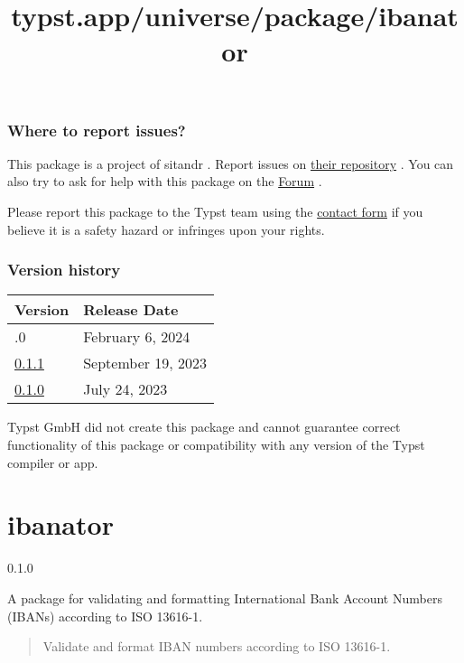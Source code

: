 \subsubsection{Where to report issues?}\label{where-to-report-issues}

This package is a project of sitandr . Report issues on
\href{https://github.com/sitandr/conchord}{their repository} . You can
also try to ask for help with this package on the
\href{https://forum.typst.app}{Forum} .

Please report this package to the Typst team using the
\href{https://typst.app/contact}{contact form} if you believe it is a
safety hazard or infringes upon your rights.

\label{versions}
\subsubsection{Version history}\label{version-history}

\begin{longtable}[]{@{}ll@{}}
\toprule\noalign{}
Version & Release Date \\
\midrule\noalign{}
\endhead
\bottomrule\noalign{}
\endlastfoot
0.2.0 & February 6, 2024 \\
\href{https://typst.app/universe/package/conchord/0.1.1/}{0.1.1} &
September 19, 2023 \\
\href{https://typst.app/universe/package/conchord/0.1.0/}{0.1.0} & July
24, 2023 \\
\end{longtable}

Typst GmbH did not create this package and cannot guarantee correct
functionality of this package or compatibility with any version of the
Typst compiler or app.


\title{typst.app/universe/package/ibanator}

\label{banner}
\section{ibanator}\label{ibanator}

{ 0.1.0 }

A package for validating and formatting International Bank Account
Numbers (IBANs) according to ISO 13616-1.

\label{readme}
\begin{quote}
Validate and format IBAN numbers according to ISO 13616-1.
\end{quote}


